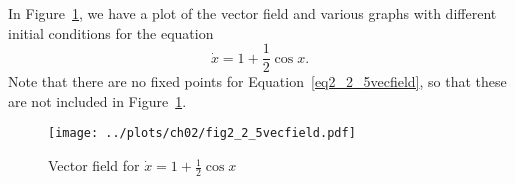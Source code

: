 
In Figure~\ref{fig2_2_5vecfield}, we have a plot of the vector field and various graphs 
with different initial conditions for the equation 
\begin{equation}
    \dot{x} = 1 + \frac{1}{2}\cos{x}.
    \label{eq2_2_5vecfield}
\end{equation}
Note that there are no fixed points for Equation~\eqref{eq2_2_5vecfield}, so that these 
are not included in Figure~\ref{fig2_2_5vecfield}.
\begin{figure}[!ht]
    \texttt{[image: ../plots/ch02/fig2\_2\_5vecfield.pdf]}
    \caption{Vector field for $\dot{x} = 1 + \frac{1}{2}\cos{x}$
        \label{fig2_2_5vecfield}}
\end{figure}
